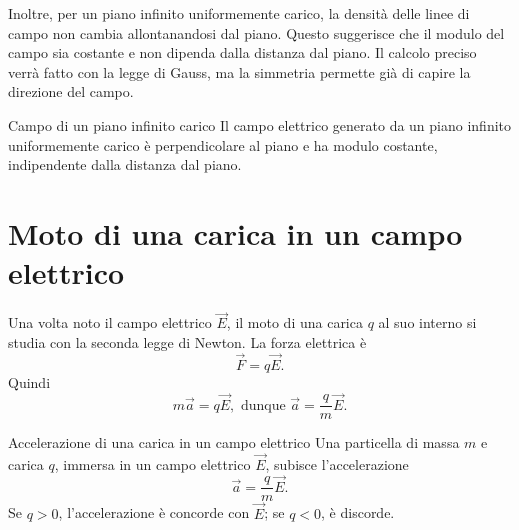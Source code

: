 \documentclass[a4paper]{article}
\begin{document}
\begin{center}
\end{center}

Inoltre, per un piano infinito uniformemente carico, la densità delle linee di campo non cambia allontanandosi dal piano. Questo suggerisce che il modulo del campo sia costante e non dipenda dalla distanza dal piano. Il calcolo preciso verrà fatto con la legge di Gauss, ma la simmetria permette già di capire la direzione del campo.

\begin{snippetproposition}{Campo di un piano infinito carico}
    Il campo elettrico generato da un piano infinito uniformemente carico è perpendicolare al piano e ha modulo costante, indipendente dalla distanza dal piano.
\end{snippetproposition}

\section{Moto di una carica in un campo elettrico}

Una volta noto il campo elettrico \(\vec{E}\), il moto di una carica \(q\) al suo interno si studia con la seconda legge di Newton. La forza elettrica è
\[
    \vec{F}=q\vec{E}.
\]
Quindi
\[
    m\vec{a}=q\vec{E},
    \text{ dunque }
    \vec{a}=\frac{q}{m}\vec{E}.
\]

\begin{snippetproposition}{Accelerazione di una carica in un campo elettrico}
    Una particella di massa \(m\) e carica \(q\), immersa in un campo elettrico \(\vec{E}\), subisce l'accelerazione
    \[
        \vec{a}=\frac{q}{m}\vec{E}.
    \]
    Se \(q>0\), l'accelerazione è concorde con \(\vec{E}\); se \(q<0\), è discorde.
\end{snippetproposition}
\end{document}

